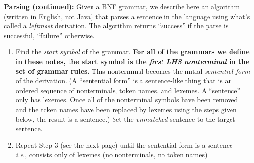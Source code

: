 \begin{minipage}[t]{\sw}
\slidenumber
\LARGE
{\bf Parsing (continued):}\exx
Given a BNF grammar,
we describe here an algorithm (written in English, not Java)
that parses a sentence in the language
using what's called a {\em leftmost} derivation.
The algorithm returns ``success'' if the parse is successful,
``failure'' otherwise.
\begin{enumerate}
\itemsep -0.5ex
\item
  Find the {\em start symbol} of the grammar.
  {\bf For all of the grammars we define in these notes,
  the start symbol is
  the {\em first LHS nonterminal} in the set of grammar rules.}
  This nonterminal becomes the initial {\em sentential form}
  of the derivation.
  (A ``sentential form'' is a sentence-like thing
  that is an ordered sequence of nonterminals, token names, and lexemes.
  A ``sentence'' only has lexemes.
  Once all of the nonterminal symbols have been removed
  and the token names have been replaced by lexemes
  using the steps given below,
  the result is a sentence.)
  Set the {\em unmatched} sentence to the target sentence.
\item
  Repeat Step 3 (see the next page)
  until the sentential form is a sentence -- {\em i.e.},
  consists only of lexemes (no nonterminals, no token names).
\end{enumerate}
\end{minipage}
\clearpage
